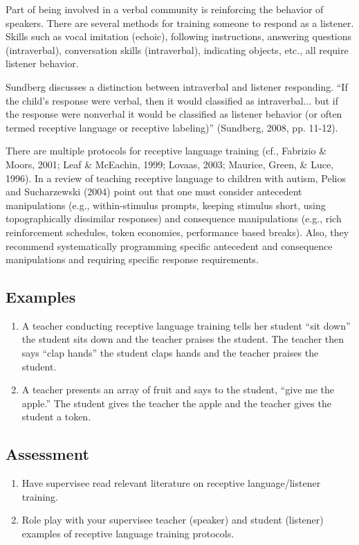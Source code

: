 Part of being involved in a verbal community is reinforcing the behavior of speakers. There are several methods for training someone to respond as a listener. Skills such as vocal imitation (echoic), following instructions, answering questions (intraverbal), conversation skills (intraverbal), indicating objects, etc., all require listener behavior. 

Sundberg discusses a distinction between intraverbal and listener responding. ``If the child's response were verbal, then it would classified as intraverbal... but if the response were nonverbal it would be classified as listener behavior (or often termed receptive language or receptive labeling)'' (Sundberg, 2008, pp. 11-12).

There are multiple protocols for receptive language training (cf., Fabrizio \& Moors, 2001; Leaf \& McEachin, 1999; Lovaas, 2003; Maurice, Green, \& Luce, 1996). In a review of teaching receptive language to children with autism, Pelios and Sucharzewski (2004) point out that one must consider antecedent manipulations (e.g., within-stimulus prompts, keeping stimulus short, using topographically dissimilar responses) and consequence manipulations (e.g., rich reinforcement schedules, token economies, performance based breaks).  Also, they recommend systematically programming specific antecedent and consequence manipulations and requiring specific response requirements.

\subsection{Examples}
\begin{enumerate}
\item A teacher conducting receptive language training tells her student ``sit down'' the student sits down and the teacher praises the student. The teacher then says ``clap hands'' the student claps hands and the teacher praises the student.
\item A teacher presents an array of fruit and says to the student, ``give me the apple.'' The student gives the teacher the apple and the teacher gives the student a token. 
\end{enumerate}
%
\subsection{Assessment}
\begin{enumerate}
\item Have supervisee read relevant literature on receptive language/listener training.
\item Role play with your supervisee teacher (speaker) and student (listener) examples of receptive language training protocols.
\end{enumerate}
%
